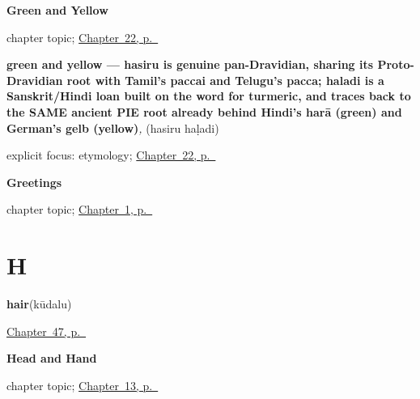 \noindent\begin{minipage}[t]{\linewidth}
\raggedright
\textbf{Green and Yellow}\par
\footnotesize chapter topic; \hyperref[ch:ka-green-and-yellow]{Chapter~22, p.~\pageref*{ch:ka-green-and-yellow}}
\end{minipage}\par\smallskip

\noindent\begin{minipage}[t]{\linewidth}
\raggedright
\textbf{green and yellow — hasiru is genuine pan-Dravidian, sharing its Proto-Dravidian root with Tamil's paccai and Telugu's pacca; haladi is a Sanskrit/Hindi loan built on the word for turmeric, and traces back to the SAME ancient PIE root already behind Hindi's harā (green) and German's gelb (yellow)}\enspace\emph{, }\enspace(hasiru haḷadi)\par
\footnotesize explicit focus: etymology; \hyperref[ch:ka-green-and-yellow]{Chapter~22, p.~\pageref*{ch:ka-green-and-yellow}}
\end{minipage}\par\smallskip

\noindent\begin{minipage}[t]{\linewidth}
\raggedright
\textbf{Greetings}\par
\footnotesize chapter topic; \hyperref[ch:greetings]{Chapter~1, p.~\pageref*{ch:greetings}}
\end{minipage}\par\smallskip

\section*{H}

\noindent\begin{minipage}[t]{\linewidth}
\raggedright
\textbf{hair}\enspace\emph{}\enspace(kūdalu)\par
\footnotesize \hyperref[ch:ka-body-more]{Chapter~47, p.~\pageref*{ch:ka-body-more}}
\end{minipage}\par\smallskip

\noindent\begin{minipage}[t]{\linewidth}
\raggedright
\textbf{Head and Hand}\par
\footnotesize chapter topic; \hyperref[ch:ka-head-and-hand]{Chapter~13, p.~\pageref*{ch:ka-head-and-hand}}
\end{minipage}\par\smallskip

